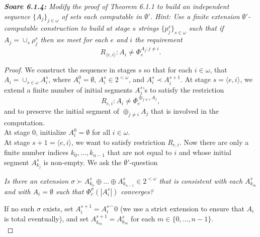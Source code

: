\documentclass{article}
\begin{document}
\it \textbf{Soare 6.1.4:} Modify the proof of Theorem 6.1.1 to build an
  independent sequence $\{A_j\}_{j\in\omega}$ of sets each computable in
  $\emptyset'$. Hint: Use a finite extension $\emptyset'$-computable
  construction to build at stage $s$ strings $\{p_j^s\}_{s\in\omega}$ such
  that if $A_j=\cup_s \rho_j^s$ then we meet for each $e$ and $i$ the
  requirement
  \[R_{\langle e,i\rangle} :A_i\neq \Phi_e^{A_j:j\neq i}.\]

  \begin{proof}
    We construct the sequence in stages $s$ so that for
    each $i\in\omega$, that $A_i=\cup_{s\in\omega} A_{i}^s$, where
    $A_i^0=\emptyset$, $A_i^s\in2^{<\omega}$, and $A_i^s\prec A_i^{s+1}$.
    At stage $s=\langle e,i\rangle$, we extend a finite number of initial
    segments $A_j^s$'s to satisfy the restriction
    \begin{equation}
      R_{e,i}: A_{i} \neq \Phi_{e}^{\oplus_{j\neq i} A_j},
      \label{eq:join}
    \end{equation}
    and to preserve the initial segment of $\oplus_{j\neq i}A_j$ that is
    involved in the computation. \\


    At stage 0, initialize $A_i^0=\emptyset$ for all $i\in\omega$. \\

    At stage $s+1=\langle e,i\rangle$, we want to satisfy restriction
    $R_{e,i}$. Now there are only a finite number indices
    $k_0,\ldots,k_{n-1}$ that are not equal to $i$ and whose initial
    segment $A_{k_j}^s$ is non-empty. We ask the $\emptyset'$-question
    \begin{center}
      \textit{Is there an extension $\sigma \succ A_{k_0}^s\oplus \ldots
      \oplus A_{k_{n-1}}^s\in 2^{<\omega}$ that is consistent with each
      $A_{k_m}^s$ and with $A_{i}=\emptyset$ such that $\Phi_{e}^\sigma
      (|A_{i}^s|)$ converges?}
    \end{center}

    If no such $\sigma$ exists, set $A_{i}^{s+1}=A_{i}^{s\frown}0$ (we use
    a strict extension to ensure that $A_{i}$ is total eventually), and
    set $A_{k_m}^{s+1}=A_{k_m}^{s}$ for each $m\in\{0,\ldots,n-1\}$. \\


\end{proof}
\end{document}
